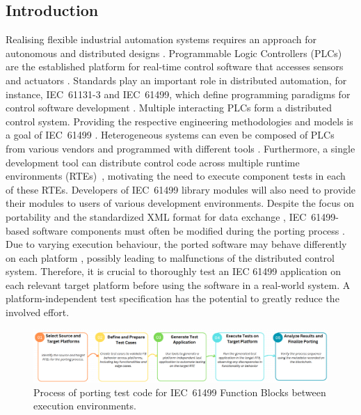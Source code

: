 \begin{bibunit}
\thispagestyle{plain}

\newcommand{\RNum}[1]{\uppercase\expandafter{\romannumeral #1\relax}}

\section{Introduction}
\label{sec:introduction}
Realising flexible industrial automation systems requires an approach
 for autonomous and distributed designs \cite{Lyu.2021}. Programmable Logic Controllers (PLCs) are the established platform for real-time control software that accesses sensors and actuators \cite{Sehr.2021}.  Standards play an important role in distributed automation, for instance, IEC~61131-3 and IEC~61499, which define programming paradigms for control software development \cite{Lyu.2021}. %
 Multiple interacting PLCs form a distributed control system. Providing the respective engineering methodologies and models is a goal of IEC~61499 \cite{61499}. Heterogeneous systems can even be composed of PLCs from various vendors and programmed with different tools \cite{lyu2020towards} \cite{mazzolini2017structured}. Furthermore, a single development tool can distribute control code across multiple runtime environments (RTEs)~\cite{eclipse4diac}, motivating the need to execute component tests in each of these RTEs. Developers of IEC~61499 library modules  \cite{oberlehner.2022} will also need to provide their modules to users of various development environments. 
 Despite the focus on portability \cite{61499} and the standardized XML format for data exchange \cite{61499.2}, IEC~61499-based software components must often be modified during the porting process \cite{Hopsu.2019, Testing_Midhun}. Due to varying execution behaviour, the ported software may behave differently on each platform \cite{Testing_Midhun, Wiesmayr.2023}, possibly leading to malfunctions of the distributed control system. Therefore, it is crucial to thoroughly test an IEC 61499 application on each relevant target platform before using the software in a real-world system. A platform-independent test specification has the potential to greatly reduce the involved effort.

\begin{figure}[!htbp]
    \centering
    \includegraphics[width=0.95\linewidth]{MX_Papers/Paper10/Figures/portingProcessPNG.PNG}
    \caption{Process of porting test code for IEC~61499 Function Blocks between execution environments.}
    \label{fig:porting_process}
\end{figure}


\end{bibunit}
